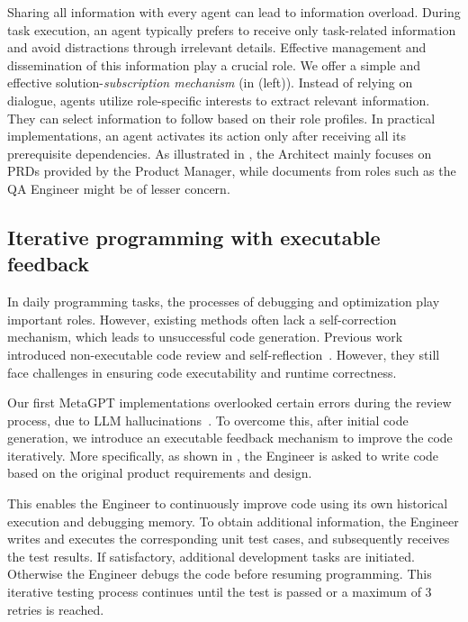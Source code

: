 Sharing all information with every agent can lead to information overload. 
%
During task execution, an agent typically prefers to receive only task-related information and avoid distractions through irrelevant details.
%
Effective management and dissemination of this information play a crucial role.
% 
We offer a simple and effective solution-\textit{subscription mechanism} (in  (left)). 
%
Instead of relying on dialogue, agents utilize role-specific interests to extract relevant information. They can select information to follow based on their role profiles.
%
In practical implementations, an agent activates its action only after receiving all its prerequisite dependencies.  As illustrated in , the Architect mainly focuses on PRDs provided by the Product Manager, while documents from roles such as the QA Engineer might be of lesser concern. 

\subsection{Iterative programming with executable feedback}
\label{sec:feedback}
In daily programming tasks, the processes of debugging and optimization play important roles. However, existing methods often lack a self-correction mechanism, which leads to unsuccessful code generation.
%
Previous work introduced non-executable code review and self-reflection~\citep{zhao2023chat,yao2022react,shinn2023reflexion,dong2023self}. However, they still face challenges in ensuring code executability and runtime correctness.

Our first MetaGPT implementations overlooked certain errors during the review process, due to LLM hallucinations~\citep{manakul2023selfcheckgpt}. To overcome this, after initial code generation, we introduce an executable feedback mechanism to improve the code iteratively.
More specifically, as shown in , the Engineer is asked to write code based on the original product requirements and design.

%
This enables the Engineer to continuously improve code using its own historical execution and debugging memory.
%
To obtain additional information, the Engineer writes and executes the corresponding unit test cases, and subsequently receives the test results. If satisfactory, additional development tasks are initiated. Otherwise the Engineer debugs the code before resuming programming. This iterative testing process continues until the test is passed or a maximum of 3 retries is reached.